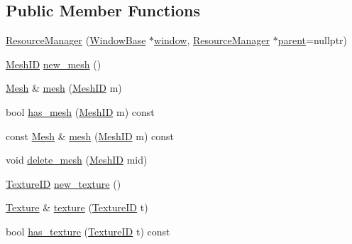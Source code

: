\subsection*{Public Member Functions}
\begin{DoxyCompactItemize}
\item 
\hyperlink{classkglt_1_1_resource_manager_abb83080c801499e440fd429e60b9efd8}{Resource\-Manager} (\hyperlink{classkglt_1_1_window_base}{Window\-Base} $\ast$\hyperlink{classkglt_1_1_resource_manager_a23c2bbe15400209d97f254389685f091}{window}, \hyperlink{classkglt_1_1_resource_manager}{Resource\-Manager} $\ast$\hyperlink{classkglt_1_1_resource_manager_a78c5c9e94925b48e7851a9565d79c586}{parent}=nullptr)
\item 
\hyperlink{namespacekglt_a525b047f668a129a0b102be7f2fe32be}{Mesh\-I\-D} \hyperlink{classkglt_1_1_resource_manager_ad657fa1efe7974b8f6957e329e188571}{new\-\_\-mesh} ()
\item 
\hyperlink{classkglt_1_1_mesh}{Mesh} \& \hyperlink{classkglt_1_1_resource_manager_ac668cb35055905092e48e45e355cb59f}{mesh} (\hyperlink{namespacekglt_a525b047f668a129a0b102be7f2fe32be}{Mesh\-I\-D} m)
\item 
bool \hyperlink{classkglt_1_1_resource_manager_aa9a70e998c3f4ba8eef714fa09a56030}{has\-\_\-mesh} (\hyperlink{namespacekglt_a525b047f668a129a0b102be7f2fe32be}{Mesh\-I\-D} m) const 
\item 
const \hyperlink{classkglt_1_1_mesh}{Mesh} \& \hyperlink{classkglt_1_1_resource_manager_af9ce557821bafee0d72bfe4e81ccd6e2}{mesh} (\hyperlink{namespacekglt_a525b047f668a129a0b102be7f2fe32be}{Mesh\-I\-D} m) const 
\item 
void \hyperlink{classkglt_1_1_resource_manager_a44d621d2e03faab4c96189b5d7598d01}{delete\-\_\-mesh} (\hyperlink{namespacekglt_a525b047f668a129a0b102be7f2fe32be}{Mesh\-I\-D} mid)
\item 
\hyperlink{namespacekglt_aaea040f25edb7f75ca0f3aa8136a45a1}{Texture\-I\-D} \hyperlink{classkglt_1_1_resource_manager_a0017fb3fb5b917bd97fde8727e6d239b}{new\-\_\-texture} ()
\item 
\hyperlink{classkglt_1_1_texture}{Texture} \& \hyperlink{classkglt_1_1_resource_manager_ad8cd7b2b563e943607a9ee273438c48d}{texture} (\hyperlink{namespacekglt_aaea040f25edb7f75ca0f3aa8136a45a1}{Texture\-I\-D} t)
\item 
bool \hyperlink{classkglt_1_1_resource_manager_a35f26c45537320e771633ff8dcf9a4fe}{has\-\_\-texture} (\hyperlink{namespacekglt_aaea040f25edb7f75ca0f3aa8136a45a1}{Texture\-I\-D} t) const 
\item 

\end{DoxyCompactItemize}
